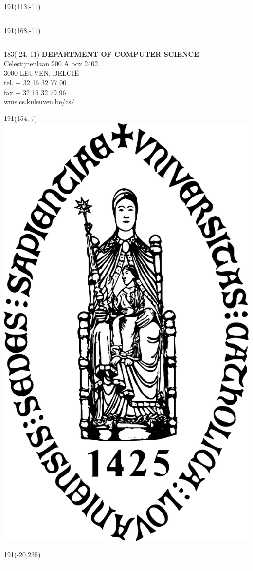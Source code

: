 \newpage
\thispagestyle{empty}
\sffamily
%
\begin{textblock}{191}(113,-11)
{\color{blueline}\rule{160pt}{5.5pt}}
\end{textblock}
%
\begin{textblock}{191}(168,-11)
{\color{blueline}\rule{5.5pt}{59pt}}
\end{textblock}
%
\begin{textblock}{183}(-24,-11)
\textblockcolour{}
\flushright
\fontsize{7}{7.5}\selectfont
\textbf{DEPARTMENT OF COMPUTER SCIENCE}\\
Celestijnenlaan 200 A box 2402\\
3000 LEUVEN, BELGI\"{E}\\
tel. + 32 16 32 77 00\\
fax + 32 16 32 79 96\\
wms.cs.kuleuven.be/cs/\\
\end{textblock}
%
\begin{textblock}{191}(154,-7)
\textblockcolour{}
\includegraphics*[height=16.5truemm]{backpage/sedes}
\end{textblock}
%
\begin{textblock}{191}(-20,235)
{\color{bluetitle}\rule{544pt}{55pt}}
\end{textblock}